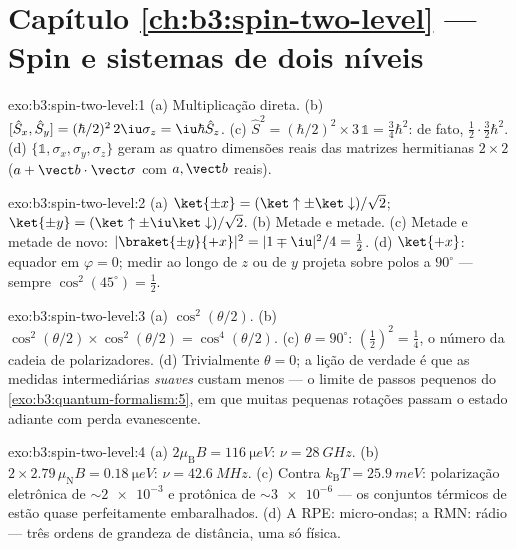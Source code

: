 \section*{Capítulo \ref{ch:b3:spin-two-level} --- Spin e sistemas de dois níveis}

\begin{solution}{exo:b3:spin-two-level:1}
(a) Multiplicação direta. (b) $[\hat S_x, \hat S_y] =
(\hbar/2)^2\,2\iu\sigma_z = \iu\hbar\hat S_z$. (c) $\hat S^2 =
(\hbar/2)^2 \times 3\,\mathbb 1 = \tfrac34\hbar^2$: de fato,
$\tfrac12\cdot\tfrac32\hbar^2$. (d) $\{\mathbb 1, \sigma_x,
\sigma_y, \sigma_z\}$ geram as quatro dimensões reais das matrizes
hermitianas $2\times2$ ($a + \vect b\cdot\vect\sigma$ com $a,
\vect b$ reais).
\end{solution}

\begin{solution}{exo:b3:spin-two-level:2}
(a) $\ket{\pm x} = (\ket\uparrow \pm \ket\downarrow)/\sqrt2$;
$\ket{\pm y} = (\ket\uparrow \pm \iu\ket\downarrow)/\sqrt2$. (b)
Metade e metade. (c) Metade e metade de novo: $|\braket{\pm y}{+x}|^2 =
|1 \mp \iu|^2/4 = \tfrac12$. (d) $\ket{+x}$: equador em $\varphi =
0$; medir ao longo de $z$ ou de $y$ projeta sobre polos a $90^\circ$
--- sempre $\cos^2(45^\circ) = \tfrac12$.
\end{solution}

\begin{solution}{exo:b3:spin-two-level:3}
(a) $\cos^2(\theta/2)$. (b) $\cos^2(\theta/2) \times
\cos^2(\theta/2) = \cos^4(\theta/2)$. (c) $\theta = 90^\circ$:
$(\tfrac12)^2 = \tfrac14$, o número da cadeia de polarizadores. (d)
Trivialmente $\theta = 0$; a lição de verdade é que as medidas
intermediárias \emph{suaves} custam menos --- o limite de passos
pequenos do \cref{exo:b3:quantum-formalism:5}, em que muitas pequenas
rotações passam o estado adiante com perda evanescente.
\end{solution}

\begin{solution}{exo:b3:spin-two-level:4}
(a) $2\mu_{\text{B}}B = \qty{116}{\micro eV}$: $\nu =
\qty{28}{GHz}$. (b) $2 \times 2.79\,\mu_{\text{N}}B =
\qty{0.18}{\micro eV}$: $\nu = \qty{42.6}{MHz}$. (c) Contra
$k_{\text{B}}T = \qty{25.9}{meV}$: polarização eletrônica de
$\sim\num{2e-3}$ e protônica de $\sim\num{3e-6}$ --- os conjuntos
térmicos de  estão quase perfeitamente embaralhados. (d) A RPE:
micro-ondas; a RMN: rádio --- três ordens de grandeza de distância,
uma só física.
\end{solution}

